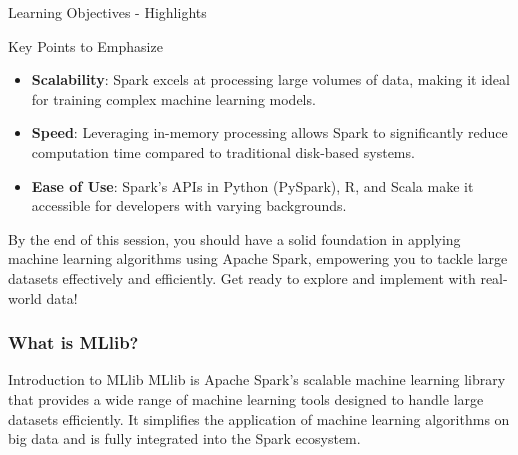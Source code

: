 \documentclass[aspectratio=169]{beamer}
\begin{document}
\begin{frame}[fragile]{Learning Objectives - Highlights}
  \begin{block}{Key Points to Emphasize}
    \begin{itemize}
      \item \textbf{Scalability}: Spark excels at processing large volumes of data, making it ideal for training complex machine learning models.
      \item \textbf{Speed}: Leveraging in-memory processing allows Spark to significantly reduce computation time compared to traditional disk-based systems.
      \item \textbf{Ease of Use}: Spark’s APIs in Python (PySpark), R, and Scala make it accessible for developers with varying backgrounds.
    \end{itemize}
  \end{block}
  
  By the end of this session, you should have a solid foundation in applying machine learning algorithms using Apache Spark, empowering you to tackle large datasets effectively and efficiently. Get ready to explore and implement with real-world data!
\end{frame}

\begin{frame}[fragile]
    \frametitle{What is MLlib?}
    \begin{block}{Introduction to MLlib}
        MLlib is Apache Spark's scalable machine learning library that provides a wide range of machine learning tools designed to handle large datasets efficiently. It simplifies the application of machine learning algorithms on big data and is fully integrated into the Spark ecosystem.
    \end{block}
\end{frame}
\end{document}
